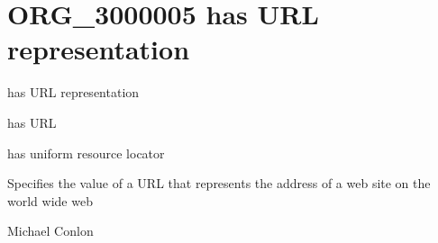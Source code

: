 \documentclass[letterpaper,10pt,english]{sphinxmanual}
\begin{document}
\section{ORG\_3000005 \sphinxhyphen{} has URL representation}
\label{\detokenize{doc-ORG_3000005:org-3000005-has-url-representation}}\label{\detokenize{doc-ORG_3000005:index-0}}\label{\detokenize{doc-ORG_3000005::doc}}
\begin{sphinxShadowBox}

\sphinxAtStartPar
has URL representation
\end{sphinxShadowBox}

\begin{sphinxShadowBox}

\sphinxAtStartPar
has URL
\end{sphinxShadowBox}

\begin{sphinxShadowBox}

\sphinxAtStartPar
has uniform resource locator
\end{sphinxShadowBox}

\begin{sphinxShadowBox}

\sphinxAtStartPar
{\hyperref[\detokenize{doc-OBI_0002815::doc}]{}}
\end{sphinxShadowBox}

\begin{sphinxShadowBox}

\sphinxAtStartPar
Specifies the value of a URL that represents the address of a web site on the world wide web
\end{sphinxShadowBox}

\begin{sphinxShadowBox}

\sphinxAtStartPar
Michael Conlon 
\end{sphinxShadowBox}

\begin{sphinxShadowBox}

\sphinxAtStartPar
{\hyperref[\detokenize{doc-ORG_0000057::doc}]{}}
\end{sphinxShadowBox}
\end{document}
